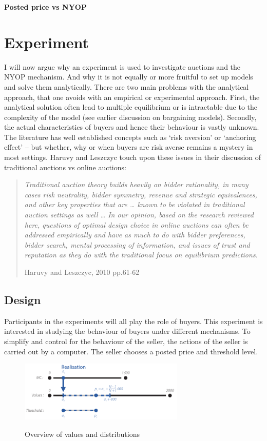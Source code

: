 \documentclass[a4paper,12pt]{article}
\begin{document}
	{\bf Posted price vs NYOP}


	\section{Experiment}

	I will now argue why an experiment is used to investigate auctions and the NYOP mechanism. And why it is not equally or more fruitful to set up models and solve them analytically. There are two main problems with the analytical approach, that one avoids with an empirical or experimental approach. First, the analytical solution often lead to multiple equilibrium or is intractable due to the complexity of the model (see earlier discussion on bargaining models). Secondly, the actual characteristics of buyers and hence their behaviour is vastly unknown. The literature has well established concepts such as `risk aversion' or `anchoring effect' -- but whether, why or when buyers are risk averse remains a mystery in most settings. Haruvy and Leszczyc touch upon these issues in their discussion of traditional auctions vs online auctions:
	\blockquote[Haruvy and Leszczyc, 2010 pp.61-62]{\emph{Traditional auction theory builds heavily on bidder rationality, in many cases risk neutrality, bidder symmetry, revenue and strategic equivalences, and other key properties that are … known to be violated in traditional auction settings as well … In our opinion, based on the research reviewed here, questions of optimal design choice in online auctions can often be addressed empirically and have as much to do with bidder preferences, bidder search, mental processing of information, and issues of trust and reputation as they do with the traditional focus on equilibrium predictions. }}


	\subsection{Design}

	Participants in the experiments will all play the role of buyers. This experiment is interested in studying the behaviour of buyers under different mechanisms. To simplify and control for the behaviour of the seller, the actions of the seller is carried out by a computer. The seller chooses a posted price and threshold level.

	\begin{figure}[h]
	        \centering
	        \caption{Overview of values and distributions}
	        \includegraphics[width=0.7\textwidth]{Figures/Distribution}
			\label{fig:distribution}
	\end{figure}
\end{document}
